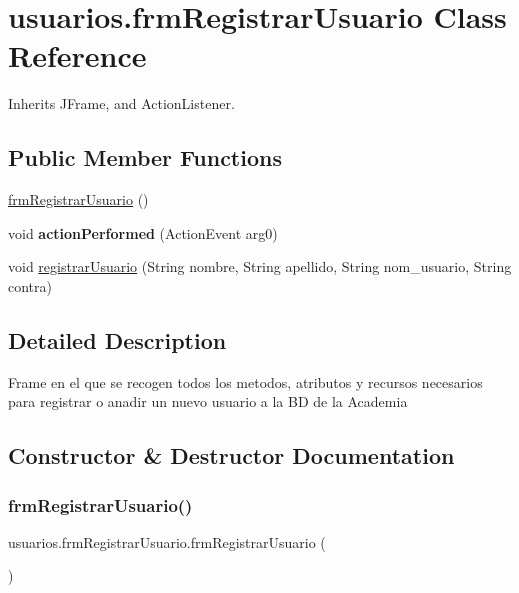 \hypertarget{classusuarios_1_1frm_registrar_usuario}{}\section{usuarios.\+frm\+Registrar\+Usuario Class Reference}
\label{classusuarios_1_1frm_registrar_usuario}


Inherits J\+Frame, and Action\+Listener.

\subsection*{Public Member Functions}
\begin{DoxyCompactItemize}
\item 
\hyperlink{classusuarios_1_1frm_registrar_usuario_ab78c574e67d750a29a4bc9311743727f}{frm\+Registrar\+Usuario} ()
\item 
\mbox{\label{classusuarios_1_1frm_registrar_usuario_afdd8b1e97c26640c7afd7538fee1229a}} 
void {\bfseries action\+Performed} (Action\+Event arg0)
\item 
void \hyperlink{classusuarios_1_1frm_registrar_usuario_a0572fba4d2261fb38a143a1ff27b6f4a}{registrar\+Usuario} (String nombre, String apellido, String nom\+\_\+usuario, String contra)
\end{DoxyCompactItemize}


\subsection{Detailed Description}
Frame en el que se recogen todos los metodos, atributos y recursos necesarios para registrar o anadir un nuevo usuario a la BD de la Academia 

\subsection{Constructor \& Destructor Documentation}
\mbox{\label{classusuarios_1_1frm_registrar_usuario_ab78c574e67d750a29a4bc9311743727f}} 
\subsubsection{\texorpdfstring{frm\+Registrar\+Usuario()}{frmRegistrarUsuario()}}
{\footnotesize\ttfamily usuarios.\+frm\+Registrar\+Usuario.\+frm\+Registrar\+Usuario (\begin{DoxyParamCaption}{ }\end{DoxyParamCaption})}

